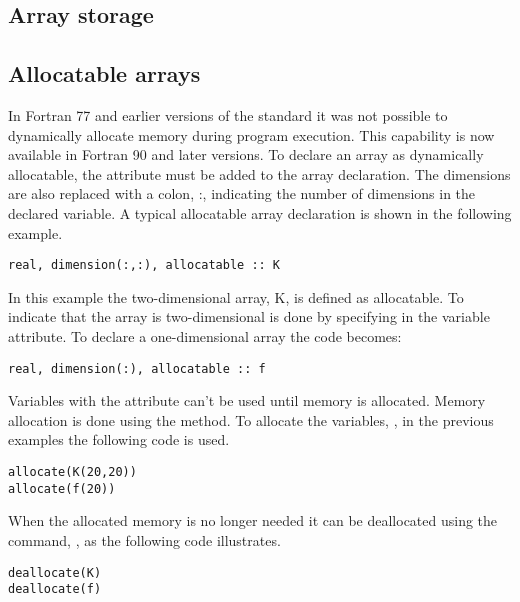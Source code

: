 \subsection{Array storage}

\subsection{Allocatable arrays}

In Fortran 77 and earlier versions of the standard it was not possible to dynamically allocate memory during program execution. This capability is now available in Fortran 90 and later versions. To declare an array as dynamically allocatable, the attribute  must be added to the array declaration. The dimensions are also replaced with a colon, :, indicating the number of dimensions in the declared variable. A typical allocatable array declaration is shown in the following example.

\begin{lstlisting}
real, dimension(:,:), allocatable :: K
\end{lstlisting}

In this example the two-dimensional array, K, is defined as allocatable. To indicate that the array is two-dimensional is done by specifying  in the variable attribute. To declare a one-dimensional array the code becomes:

\begin{lstlisting}
real, dimension(:), allocatable :: f
\end{lstlisting}

Variables with the  attribute can't be used until memory is allocated. Memory allocation is done using the  method. To allocate the variables, , in the previous examples the following code is used.

\begin{lstlisting}
allocate(K(20,20))
allocate(f(20))
\end{lstlisting}

When the allocated memory is no longer needed it can be deallocated using the command, , as the following code illustrates.

\begin{lstlisting}
deallocate(K)
deallocate(f)
\end{lstlisting}

